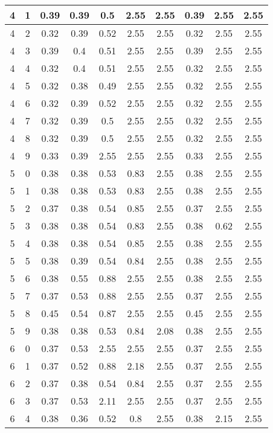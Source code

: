 \begin{longtable}{|c|c||c||c|c|c|c||c|c|c|}
	4 & 1 & 0.39 & 0.39 & 0.5 & 2.55 & 2.55 & 0.39 & 2.55 & 2.55 \\ \hline
	4 & 2 & 0.32 & 0.39 & 0.52 & 2.55 & 2.55 & 0.32 & 2.55 & 2.55 \\ \hline
	4 & 3 & 0.39 & 0.4 & 0.51 & 2.55 & 2.55 & 0.39 & 2.55 & 2.55 \\ \hline
	4 & 4 & 0.32 & 0.4 & 0.51 & 2.55 & 2.55 & 0.32 & 2.55 & 2.55 \\ \hline
	4 & 5 & 0.32 & 0.38 & 0.49 & 2.55 & 2.55 & 0.32 & 2.55 & 2.55 \\ \hline
	4 & 6 & 0.32 & 0.39 & 0.52 & 2.55 & 2.55 & 0.32 & 2.55 & 2.55 \\ \hline
	4 & 7 & 0.32 & 0.39 & 0.5 & 2.55 & 2.55 & 0.32 & 2.55 & 2.55 \\ \hline
	4 & 8 & 0.32 & 0.39 & 0.5 & 2.55 & 2.55 & 0.32 & 2.55 & 2.55 \\ \hline
	4 & 9 & 0.33 & 0.39 & 2.55 & 2.55 & 2.55 & 0.33 & 2.55 & 2.55 \\ \hline
	5 & 0 & 0.38 & 0.38 & 0.53 & 0.83 & 2.55 & 0.38 & 2.55 & 2.55 \\ \hline
	5 & 1 & 0.38 & 0.38 & 0.53 & 0.83 & 2.55 & 0.38 & 2.55 & 2.55 \\ \hline
	5 & 2 & 0.37 & 0.38 & 0.54 & 0.85 & 2.55 & 0.37 & 2.55 & 2.55 \\ \hline
	5 & 3 & 0.38 & 0.38 & 0.54 & 0.83 & 2.55 & 0.38 & 0.62 & 2.55 \\ \hline
	5 & 4 & 0.38 & 0.38 & 0.54 & 0.85 & 2.55 & 0.38 & 2.55 & 2.55 \\ \hline
	5 & 5 & 0.38 & 0.39 & 0.54 & 0.84 & 2.55 & 0.38 & 2.55 & 2.55 \\ \hline
	5 & 6 & 0.38 & 0.55 & 0.88 & 2.55 & 2.55 & 0.38 & 2.55 & 2.55 \\ \hline
	5 & 7 & 0.37 & 0.53 & 0.88 & 2.55 & 2.55 & 0.37 & 2.55 & 2.55 \\ \hline
	5 & 8 & 0.45 & 0.54 & 0.87 & 2.55 & 2.55 & 0.45 & 2.55 & 2.55 \\ \hline
	5 & 9 & 0.38 & 0.38 & 0.53 & 0.84 & 2.08 & 0.38 & 2.55 & 2.55 \\ \hline
	6 & 0 & 0.37 & 0.53 & 2.55 & 2.55 & 2.55 & 0.37 & 2.55 & 2.55 \\ \hline
	6 & 1 & 0.37 & 0.52 & 0.88 & 2.18 & 2.55 & 0.37 & 2.55 & 2.55 \\ \hline
	6 & 2 & 0.37 & 0.38 & 0.54 & 0.84 & 2.55 & 0.37 & 2.55 & 2.55 \\ \hline
	6 & 3 & 0.37 & 0.53 & 2.11 & 2.55 & 2.55 & 0.37 & 2.55 & 2.55 \\ \hline
	6 & 4 & 0.38 & 0.36 & 0.52 & 0.8 & 2.55 & 0.38 & 2.15 & 2.55 \\ \hline

\end{longtable}
